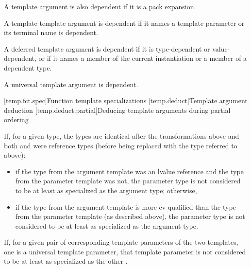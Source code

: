 \documentclass{wg21}
\begin{document}
\pnum
A template argument is also dependent if it is a pack expansion.

\pnum
A template template argument is dependent if
it names a template parameter or
its terminal name is dependent.

\begin{addedblock}
A deferred template argument  is dependent
if it is type-dependent or value-dependent, or
if it names a member of the current instantiation or a member of a dependent type.

A universal template argument is dependent.
\end{addedblock}



[temp.fct.spec]{Function template specializations}
[temp.deduct]{Template argument deduction}
[temp.deduct.partial]{Deducing template arguments during partial ordering}

\pnum
If, for a given type, the
types are identical after the transformations above
and both  and  were reference types (before being replaced with the
type referred to above):
\begin{itemize}
    \item if the type from the argument template was an lvalue reference and the type
    from the parameter template was not,
    the parameter type is not considered to be
    at least as specialized as the argument type; otherwise,
    \item if the type from
    the argument template is more cv-qualified than the type from the
    parameter template (as described above),
    the parameter type is not considered to be
    at least as specialized as the argument type.
\end{itemize}
\begin{addedblock}
    \pnum
    If, for a given pair of corresponding template parameters of the two templates,
    one is a universal template parameter,
    that template parameter is not considered to be
    at least as specialized as the other%
    .
\end{addedblock}
\end{document}
